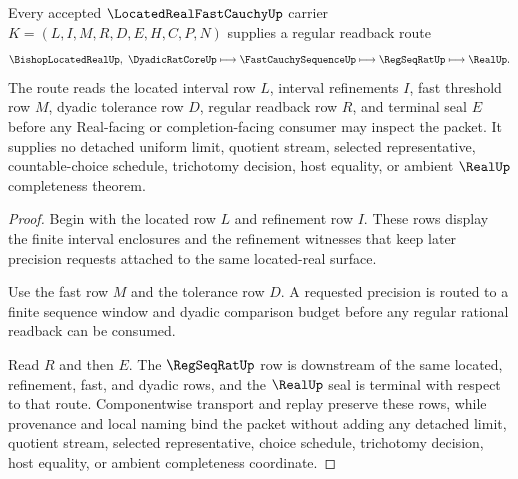 \begin{theorem}
\label{thm:located-real-fast-cauchy-regular-readback}
Every accepted $\LocatedRealFastCauchyUp$ carrier $K=(L,I,M,R,D,E,H,C,P,N)$ supplies a regular readback route
$$
\BishopLocatedRealUp,\ \DyadicRatCoreUp
\longmapsto
\FastCauchySequenceUp
\longmapsto
\RegSeqRatUp
\longmapsto
\RealUp .
$$
The route reads the located interval row $L$, interval refinements $I$, fast threshold row $M$, dyadic tolerance row $D$, regular readback row $R$, and terminal seal $E$ before any Real-facing or completion-facing consumer may inspect the packet. It supplies no detached uniform limit, quotient stream, selected representative, countable-choice schedule, trichotomy decision, host equality, or ambient $\RealUp$ completeness theorem.
\end{theorem}
\begin{proof}
Begin with the located row $L$ and refinement row $I$. These rows display the finite interval enclosures and the refinement witnesses that keep later precision requests attached to the same located-real surface.

Use the fast row $M$ and the tolerance row $D$. A requested precision is routed to a finite sequence window and dyadic comparison budget before any regular rational readback can be consumed.

Read $R$ and then $E$. The $\RegSeqRatUp$ row is downstream of the same located, refinement, fast, and dyadic rows, and the $\RealUp$ seal is terminal with respect to that route. Componentwise transport and replay preserve these rows, while provenance and local naming bind the packet without adding any detached limit, quotient stream, selected representative, choice schedule, trichotomy decision, host equality, or ambient completeness coordinate.
\end{proof}


